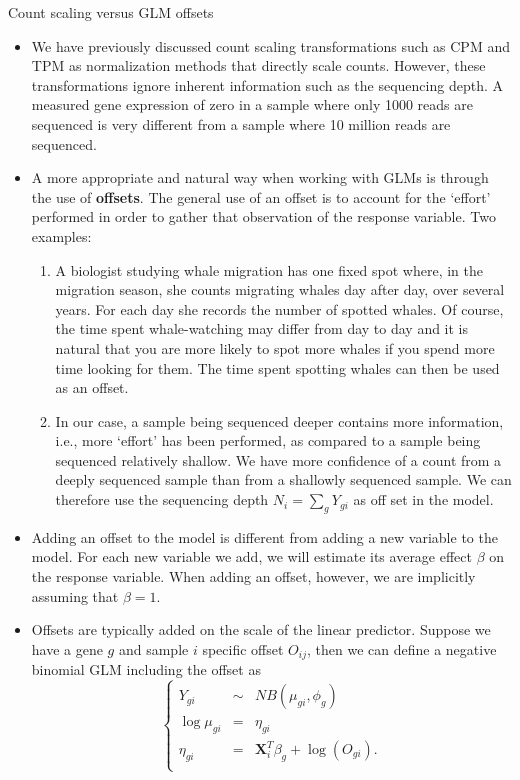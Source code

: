 \documentclass[ignorenonframetext,]{beamer}
\providecommand{\tightlist}{%
  \setlength{\itemsep}{0pt}\setlength{\parskip}{0pt}}
\begin{document}
\begin{frame}[fragile]
\begin{block}{Count scaling versus GLM offsets}

\begin{itemize}
\tightlist
\item
  We have previously discussed count scaling transformations such as CPM
  and TPM as normalization methods that directly scale counts. However,
  these transformations ignore inherent information such as the
  sequencing depth. A measured gene expression of zero in a sample where
  only 1000 reads are sequenced is very different from a sample where 10
  million reads are sequenced.
\item
  A more appropriate and natural way when working with GLMs is through
  the use of \textbf{offsets}. The general use of an offset is to
  account for the `effort' performed in order to gather that observation
  of the response variable. Two examples:

  \begin{enumerate}
  \tightlist
  \item
    A biologist studying whale migration has one fixed spot where, in
    the migration season, she counts migrating whales day after day,
    over several years. For each day she records the number of spotted
    whales. Of course, the time spent whale-watching may differ from day
    to day and it is natural that you are more likely to spot more
    whales if you spend more time looking for them. The time spent
    spotting whales can then be used as an offset.
  \item
    In our case, a sample being sequenced deeper contains more
    information, i.e., more `effort' has been performed, as compared to
    a sample being sequenced relatively shallow. We have more confidence
    of a count from a deeply sequenced sample than from a shallowly
    sequenced sample. We can therefore use the sequencing depth
    \(N_i = \sum_g Y_{gi}\) as off set in the model.
  \end{enumerate}
\item
  Adding an offset to the model is different from adding a new variable
  to the model. For each new variable we add, we will estimate its
  average effect \(\beta\) on the response variable. When adding an
  offset, however, we are implicitly assuming that \(\beta=1\).
\item
  Offsets are typically added on the scale of the linear predictor.
  Suppose we have a gene \(g\) and sample \(i\) specific offset
  \(O_{ij}\), then we can define a negative binomial GLM including the
  offset as \[
    \left\{
    \begin{array}{ccc}
    Y_{gi} & \sim & NB(\mu_{gi}, \phi_g) \\
    \log \mu_{gi} & = & \eta_{gi} \\
    \eta_{gi} & = & \mathbf{X}^T_i \beta_g + \log(O_{gi}). \\
    \end{array}
    \right.
    \]
\end{itemize}


\end{block}
\end{frame}
\end{document}
